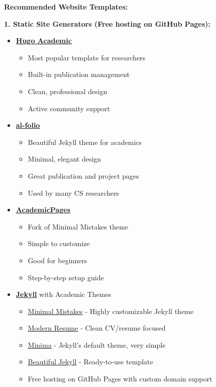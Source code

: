 \documentclass[11pt,a4paper]{article}
\begin{document}
\textbf{Recommended Website Templates:}

\textbf{1. Static Site Generators (Free hosting on GitHub Pages):}
\begin{itemize}
    \item \textbf{\href{https://github.com/wowchemy/starter-hugo-academic}{Hugo Academic}}
    \begin{itemize}
        \item Most popular template for researchers
        \item Built-in publication management
        \item Clean, professional design
        \item Active community support
    \end{itemize}
    
    \item \textbf{\href{https://github.com/alshedivat/al-folio}{al-folio}}
    \begin{itemize}
        \item Beautiful Jekyll theme for academics
        \item Minimal, elegant design
        \item Great publication and project pages
        \item Used by many CS researchers
    \end{itemize}
    
    \item \textbf{\href{https://github.com/academicpages/academicpages.github.io}{AcademicPages}}
    \begin{itemize}
        \item Fork of Minimal Mistakes theme
        \item Simple to customize
        \item Good for beginners
        \item Step-by-step setup guide
    \end{itemize}
    
    
    \item \textbf{\href{https://jekyllrb.com/}{Jekyll}} with Academic Themes
    \begin{itemize}
        \item \href{https://github.com/mmistakes/minimal-mistakes}{Minimal Mistakes} - Highly customizable Jekyll theme
        \item \href{https://github.com/sproogen/modern-resume-theme}{Modern Resume} - Clean CV/resume focused
        \item \href{https://github.com/jekyll/minima}{Minima} - Jekyll's default theme, very simple
        \item \href{https://github.com/daattali/beautiful-jekyll}{Beautiful Jekyll} - Ready-to-use template
        \item Free hosting on GitHub Pages with custom domain support
    \end{itemize}
\end{itemize}
\end{document}
